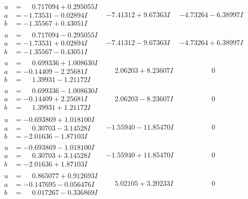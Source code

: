 \documentclass[1p]{elsarticle_modified}
\theoremstyle{definition}
\begin{document}
$$\begin{array}{c|c|c}
\begin{aligned}
u &= \phantom{-}0.717094 + 0.295055 I \\
a &= -1.73531 - 0.02894 I \\
b &= -1.35567 + 0.43051 I\end{aligned}
 & -7.41312 + 9.67363 I & -4.73264 - 6.38997 I \\ \hline\begin{aligned}
u &= \phantom{-}0.717094 - 0.295055 I \\
a &= -1.73531 + 0.02894 I \\
b &= -1.35567 - 0.43051 I\end{aligned}
 & -7.41312 - 9.67363 I & -4.73264 + 6.38997 I \\ \hline\begin{aligned}
u &= \phantom{-}0.699336 + 1.008630 I \\
a &= -0.14409 - 2.25681 I \\
b &= \phantom{-}1.39931 - 1.21172 I\end{aligned}
 & \phantom{-}2.06203 + 8.23607 I & \phantom{-0.000000 } 0 \\ \hline\begin{aligned}
u &= \phantom{-}0.699336 - 1.008630 I \\
a &= -0.14409 + 2.25681 I \\
b &= \phantom{-}1.39931 + 1.21172 I\end{aligned}
 & \phantom{-}2.06203 - 8.23607 I & \phantom{-0.000000 } 0 \\ \hline\begin{aligned}
u &= -0.693869 + 1.018100 I \\
a &= \phantom{-}0.30703 - 3.14528 I \\
b &= -2.01636 - 1.87103 I\end{aligned}
 & -1.55940 - 11.85470 I & \phantom{-0.000000 } 0 \\ \hline\begin{aligned}
u &= -0.693869 - 1.018100 I \\
a &= \phantom{-}0.30703 + 3.14528 I \\
b &= -2.01636 + 1.87103 I\end{aligned}
 & -1.55940 + 11.85470 I & \phantom{-0.000000 } 0 \\ \hline\begin{aligned}
u &= \phantom{-}0.865077 + 0.912693 I \\
a &= -0.147695 - 0.056476 I \\
b &= \phantom{-}0.017267 - 0.336869 I\end{aligned}
 & \phantom{-}5.02105 + 3.20233 I & \phantom{-0.000000 } 0 \\ \hline\begin{aligned}

\end{aligned}
\end{array}$$
\end{document}

